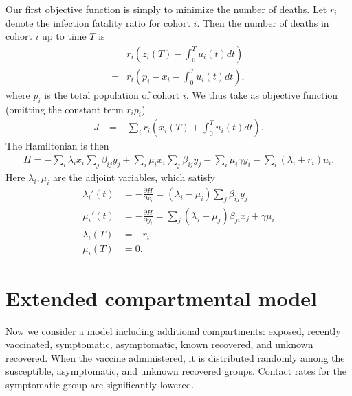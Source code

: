 \documentclass[english,12pt,letter]{article}
\begin{document}
Our first objective function is simply to minimize the number of deaths.  Let
$r_i$ denote the infection fatality ratio for cohort $i$.
Then the number of deaths in cohort $i$ up to time $T$ is
\begin{align}
 &  r_i \left(z_i(T) - \int_0^T u_i(t) dt\right) \\
 = & r_i\left(p_i-x_i - \int_0^T u_i(t) dt\right),
\end{align}
where $p_i$ is the total population of cohort $i$.
We thus take as objective function (omitting the constant term $r_i p_i$)
\begin{align}
    J & = - \sum_i r_i \left( x_i(T) + \int_0^T u_i(t) dt\right).
\end{align}
The Hamiltonian is then
\begin{align}
    H = - \sum_i \lambda_i x_i \sum_j \beta_{ij} y_j + \sum_i \mu_i x_i \sum_j \beta_{ij} y_j 
            - \sum_i \mu_i \gamma y_i - \sum_i (\lambda_i + r_i) u_i.
\end{align}
Here $\lambda_i, \mu_i$ are the adjoint variables, which satisfy
\begin{align}
    \lambda_i'(t) & = -\frac{\partial H}{\partial x_i} = (\lambda_i - \mu_i) \sum_j \beta_{ij} y_j \\
    \mu_i'(t) & = -\frac{\partial H}{\partial y_i} = \sum_j (\lambda_j - \mu_j) \beta_{ji} x_j + \gamma \mu_i \\
    \lambda_i(T) & = - r_i \\
    \mu_i(T) & = 0.
\end{align}


\section{Extended compartmental model}
Now we consider a model including additional compartments: exposed,
recently vaccinated, symptomatic, asymptomatic, known recovered, and unknown recovered.
When the vaccine administered, it is distributed randomly among the susceptible,
asymptomatic, and unknown recovered groups.  Contact rates for the symptomatic
group are significantly lowered.




\end{document}
